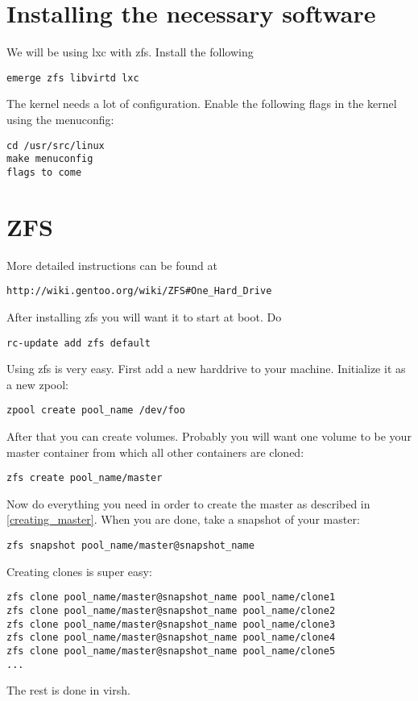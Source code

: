\documentclass[a4paper]{book}
\begin{document}
\tableofcontents

\chapter{Installing the necessary software}
We will be using lxc with zfs. Install the following
\begin{verbatim}
emerge zfs libvirtd lxc
\end{verbatim}
The kernel needs a lot of configuration. Enable the following flags in the kernel using the menuconfig:
\begin{verbatim}
cd /usr/src/linux
make menuconfig
flags to come
\end{verbatim}

\chapter{ZFS}
More detailed instructions can be found at
\begin{verbatim}
http://wiki.gentoo.org/wiki/ZFS#One_Hard_Drive
\end{verbatim}
After installing zfs you will want it to start at boot. Do
\begin{verbatim}
rc-update add zfs default
\end{verbatim}
Using zfs is very easy. First add a new harddrive to your machine. Initialize it as a new zpool:
\begin{verbatim}
zpool create pool_name /dev/foo
\end{verbatim}
After that you can create volumes. Probably you will want one volume to be your master container from which all other containers are cloned:
\begin{verbatim}
zfs create pool_name/master
\end{verbatim}
Now do everything you need in order to create the master as described in \autoref{creating_master}. When you are done, take a snapshot of your master:
\begin{verbatim}
zfs snapshot pool_name/master@snapshot_name
\end{verbatim}
Creating clones is super easy:
\begin{verbatim}
zfs clone pool_name/master@snapshot_name pool_name/clone1
zfs clone pool_name/master@snapshot_name pool_name/clone2
zfs clone pool_name/master@snapshot_name pool_name/clone3
zfs clone pool_name/master@snapshot_name pool_name/clone4
zfs clone pool_name/master@snapshot_name pool_name/clone5
...
\end{verbatim}
The rest is done in virsh.
\end{document}
